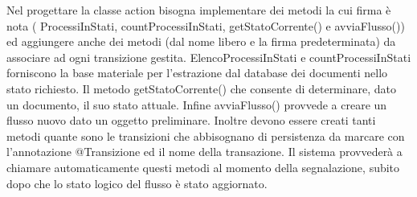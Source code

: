 Nel progettare la classe action bisogna implementare dei metodi la cui firma è nota ( ProcessiInStati,  countProcessiInStati, getStatoCorrente() e avviaFlusso()) ed aggiungere anche dei metodi (dal nome libero e la firma predeterminata)  da associare ad ogni transizione gestita.
ElencoProcessiInStati e  countProcessiInStati forniscono la base materiale per l'estrazione dal database dei documenti nello stato richiesto. 
Il metodo  getStatoCorrente() che consente di determinare, dato un documento, il suo stato attuale.
Infine avviaFlusso() provvede a creare un flusso nuovo dato un oggetto preliminare.
Inoltre devono essere creati tanti metodi quante sono le transizioni che abbisognano di persistenza da marcare con l'annotazione @Transizione ed il nome della transazione. Il sistema provvederà a chiamare automaticamente questi metodi al momento della segnalazione, subito dopo che lo stato logico del flusso è stato aggiornato.

